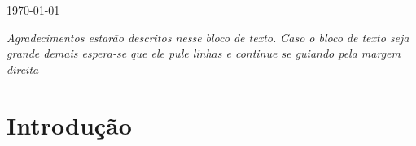 \documentclass{article}
\begin{document}
\begin{titlepage}


{\large \today}\\[3cm] %


 

\vfill %

\end{titlepage}

\newpage %

\begin{flushright}

\vspace*{\fill}

\textit{\LARGE Agradecimentos estarão descritos nesse bloco de texto. Caso o bloco de texto seja grande demais espera-se que ele pule linhas e continue se guiando pela margem direita}

\vspace*{\fill}

\end{flushright}

\newpage

\tableofcontents{}

\newpage

\section{Introdução}	
\end{document}

